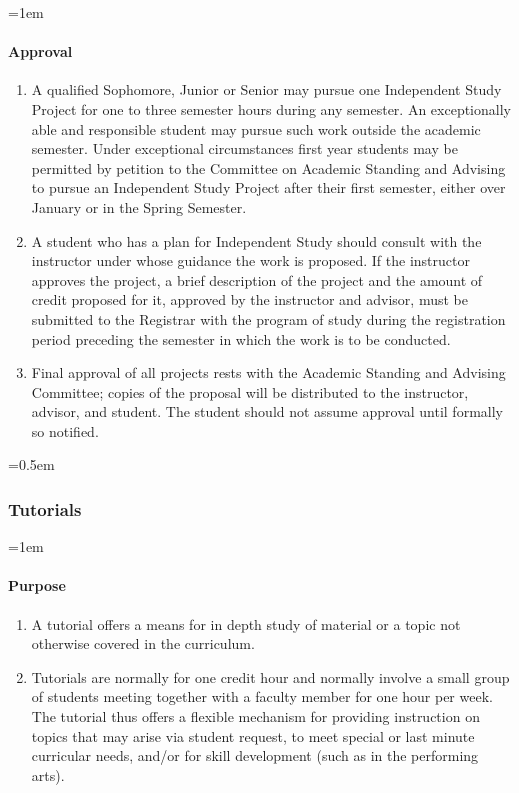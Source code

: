\documentclass{manual}
\let\oldsubsubsection\subsubsection
\renewcommand\subsubsection{\leftskip=0.5em\oldsubsubsection}
\let\oldparagraph\paragraph
\renewcommand\paragraph{\leftskip=1em\oldparagraph}
\newcommand{\itemLevelA}{\alph*.}
\newcommand{\itemRefA}{\alph*}
\begin{document}
\paragraph{Approval}
\begin{enumerate}[label=\itemLevelA,ref=\itemRefA]
\item A qualified Sophomore, Junior or Senior may pursue one Independent Study Project for one to three semester hours during any semester. An exceptionally able and responsible student may pursue such work outside the academic semester. Under exceptional circumstances first year students may be permitted by petition to the Committee on Academic Standing and Advising to pursue an Independent Study Project after their first semester, either over January or in the Spring Semester.

\item A student who has a plan for Independent Study should consult with the instructor under whose guidance the work is proposed. If the instructor approves the project, a brief description of the project and the amount of credit proposed for it, approved by the instructor and advisor, must be submitted to the Registrar with the program of study during the registration period preceding the semester in which the work is to be conducted. 

\item Final approval of all projects rests with the Academic Standing and Advising Committee; copies of the proposal will be distributed to the instructor, advisor, and student. The student should not assume approval until formally so notified.
\end{enumerate}

\subsubsection{Tutorials}

\paragraph{Purpose}
\begin{enumerate}[label=\itemLevelA,ref=\itemRefA]
\item A tutorial offers a means for in depth study of material or a topic not otherwise covered in the curriculum.  

\item Tutorials are normally for one credit hour and normally involve a small group of students meeting together with a faculty member for one hour per week.  The tutorial thus offers a flexible mechanism for providing instruction on topics that may arise via student request, to meet special or last minute curricular needs, and/or for skill development (such as in the performing arts).                                                                                                                     
\end{enumerate}
\end{document}
